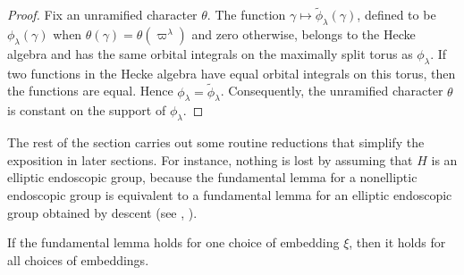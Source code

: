 \documentclass{amsart}
\newenvironment{cthm}[1]
  {\renewcommand\thethm{\sc #1}\thm}
  {\endthm}
\begin{document}
\begin{proof}  Fix an unramified character $\theta$.
The function
$\gamma\mapsto\tilde\phi_\lambda (\gamma)$, defined to be $\phi_\lambda(\gamma)$
when $\theta(\gamma) = \theta(\varpi^\lambda)$ and zero otherwise,
belongs to the Hecke algebra and has the same orbital integrals
on the maximally split torus as $\phi_\lambda$.  
If two functions in the Hecke algebra have
equal orbital integrals on this torus,
then the functions are equal.  Hence $\phi_\lambda
=\tilde\phi_\lambda$.  Consequently, the unramified character
$\theta$ is constant on the support of $\phi_\lambda$.
\end{proof}

The rest of the section carries out some routine
reductions that simplify the exposition in later
sections.  For instance, nothing is lost by assuming
that $H$ is an elliptic endoscopic group, because
the fundamental lemma for a nonelliptic endoscopic
group is equivalent to a fundamental lemma for
an elliptic endoscopic group obtained by descent (see \cite{H2}, \cite{LS2}).

\begin{cthm}{Lemma 3.3}  If the fundamental lemma holds
for one choice of embedding $\xi$, then it holds for all
choices of embeddings.
\end{cthm}
\end{document}
